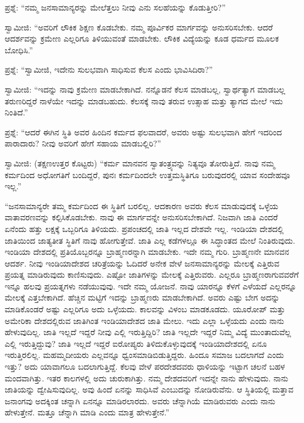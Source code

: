  ಪ್ರಶ್ನೆ: “ನಮ್ಮ ಜನಸಾಮಾನ್ಯರನ್ನು ಮೇಲೆತ್ತಲು ನೀವು ಎನು ಸಲಹೆಯನ್ನು ಕೊಡುತ್ತೀರಿ?” 

 ಸ್ವಾಮೀಜಿ: “ಅವರಿಗೆ ಲೌಕಿಕ ಶಿಕ್ಷಣ ಕೊಡಬೇಕು. ನಮ್ಮ ಪೂರ್ವಿಕರ ಮಾರ್ಗವನ್ನು ಅನುಸರಿಸಬೇಕು. ಆದರೆ ಆದರ್ಶವನ್ನು ಕ್ರಮೇಣ ಎಲ್ಲರಿಗೂ ತಿಳಿಯುವಂತೆ ಮಾಡಬೇಕು. ಲೌಕಿಕ ವಿದ್ಯೆಯನ್ನು ಕೂಡ ಧರ್ಮದ ಮೂಲಕ ಬೋಧಿಸಿ.” 

 ಪ್ರಶ್ನೆ: “ಸ್ವಾಮೀಜಿ, ಇದೇನು ಸುಲಭವಾಗಿ ಸಾಧಿಸುವ ಕೆಲಸ ಎಂದು ಭಾವಿಸಿದಿರಾ?” 

 ಸ್ವಾಮೀಜಿ: “ಇದನ್ನು ನಾವು ಕ್ರಮೇಣ ಮಾಡಬೇಕಾಗಿದೆ. ನನ್ನೊಡನೆ ಕೆಲಸ ಮಾಡಬಲ್ಲ, ಸ್ವಾರ್ಥತ್ಯಾಗ ಮಾಡಬಲ್ಲ ತರುಣರಿದ್ದರೆ ನಾಳೆಯೇ ಇದನ್ನು ಮಾಡಬಹುದು. ಕೆಲಸಕ್ಕೆ ನಾವು ತರುವ ಉತ್ಸಾಹ ಮತ್ತು ತ್ಯಾಗದ ಮೇಲೆ ಇದು ನಿಂತಿದೆ.”‌ 

 ಪ್ರಶ್ನೆ: “ಆದರೆ ಈಗಿನ ಸ್ಥಿತಿ ಅವರ ಹಿಂದಿನ ಕರ್ಮದ ಫಲವಾದರೆ, ಅವರು ಅಷ್ಟು ಸುಲಭವಾಗಿ ಹೇಗೆ ಇದರಿಂದ ಪಾರಾದಾರು? ನೀವು ಅವರಿಗೆ ಹೇಗೆ ಸಹಾಯ ಮಾಡಬಲ್ಲಿರಿ?” 

 ಸ್ವಾಮೀಜಿ: (ತಕ್ಷಣಉತ್ತರ ಕೊಟ್ಟರು) “ಕರ್ಮ ಮಾನವನ ಸ್ವಾತಂತ್ರ್ಯವನ್ನು ನಿತ್ಯವೂ ತೋರುತ್ತಿದೆ. ನಾವು ನಮ್ಮ ಕರ್ಮದಿಂದ ಅಧೋಗತಿಗೆ ಬಂದಿದ್ದರೆ, ಪುನಃ ಕರ್ಮದಿಂದಲೇ ಉತ್ತಮಸ್ಥಿತಿಗೂ ಬರುವುದರಲ್ಲಿ ಯಾವ ಸಂದೇಹವೂ ಇಲ್ಲ.” 

 “ಜನಸಾಮಾನ್ಯರೇ ತಮ್ಮ ಕರ್ಮದಿಂದ ಈ ಸ್ಥಿತಿಗೆ ಬರಲಿಲ್ಲ. ಆದಕಾರಣ ಅವರು ಕೆಲಸ ಮಾಡುವುದಕ್ಕೆ ಒಳ್ಳೆಯ ವಾತಾವರಣವನ್ನು ಕಲ್ಪಿಸಿಕೊಡಬೇಕು. ನಾವು ಈ ಮಾರ್ಗವನ್ನೇ ಅನುಸರಿಸಬೇಕಾಗಿದೆ. ನಿಜವಾಗಿ ಜಾತಿ ಎಂದರೆ ಏನೆಂದು ಹತ್ತು ಲಕ್ಷಕ್ಕೆ ಒಬ್ಬರಿಗೂ ತಿಳಿಯದು. ಪ್ರಪಂಚದಲ್ಲಿ ಜಾತಿ ಇಲ್ಲದ ದೇಶವೇ ಇಲ್ಲ. ಇಂಡಿಯಾ ದೇಶದಲ್ಲಿ ಜಾತಿಯಿಂದ ಜಾತ್ಯತೀತ ಸ್ಥಿತಿಗೆ ನಾವು ಹೋಗುತ್ತೇವೆ. ಜಾತಿ ಎಲ್ಲ ಕಡೆಗಳಲ್ಲೂ ಈ ಸಿದ್ಧಾಂತದ ಮೇಲೆ ನಿಂತಿರುವುದು. ಇಂಡಿಯಾ ದೇಶದಲ್ಲಿ ಪ್ರತಿಯೊಬ್ಬರನ್ನೂ ಬ್ರಾಹ್ಮಣರನ್ನಾಗಿ ಮಾಡಬೇಕು. ಇದೇ ನಮ್ಮ ಗುರಿ. ಬ್ರಾಹ್ಮಣನೇ ಮಾನವನ ಆದರ್ಶ. ನೀವು ಇಂಡಿಯಾದೇಶದ ಚರಿತ್ರೆಯನ್ನು ಓದಿದರೆ ಅನೇಕ ವೇಳೆ ಜನಸಾಮಾನ್ಯರನ್ನು ಮೇಲಕ್ಕೆ ಎತ್ತಿರುವ ಪ್ರಯತ್ನ ಮಾಡಿರುವುದು ಕಾಣಿಸುವುದು. ಎಷ್ಟೋ ಜಾತಿಗಳನ್ನು ಮೇಲಕ್ಕೆ ಎತ್ತಿರುವರು. ಎಲ್ಲರೂ ಬ್ರಾಹ್ಮಣರಾಗುವವರೆಗೆ ಇನ್ನೂ ಹಲವು ಪ್ರಯತ್ನಗಳು ನಡೆಯುವುವು. ಇದೇ ನಮ್ಮ ಯೋಜನೆ. ನಾವು ಯಾರನ್ನೂ ಕೆಳಗೆ ಎಳೆಯದೆ ಎಲ್ಲರನ್ನೂ ಮೇಲಕ್ಕೆ ಎತ್ತಬೇಕಾಗಿದೆ. ಹೆಚ್ಚಿನ ಮಟ್ಟಿಗೆ ಇದನ್ನು ಬ್ರಾಹ್ಮಣರು ಮಾಡಬೇಕಾಗಿದೆ. ಅವರು ಎಷ್ಟು ಬೇಗ ಅದನ್ನು ಮಾಡಿಕೊಂಡರೆ ಅಷ್ಟು ಎಲ್ಲರಿಗೂ ಅದು ಒಳ್ಳೆಯದು. ಕಾಲವನ್ನು ವಿಳಂಬ ಮಾಡಕೂಡದು. ಯೂರೋಪ್ ಮತ್ತು ಅಮೇರಿಕಾ ದೇಶದಲ್ಲಿರುವ ಜಾತಿಗಿಂತ ಇಂಡಿಯಾದೇಶದ ಜಾತಿ ಮೇಲು. ಇದು ಎಲ್ಲಾ ಒಳ್ಳೆಯದು ಎಂದು ನಾನು ಹೇಳುವುದಿಲ್ಲ. ಜಾತಿ ಇಲ್ಲದೆ ಇದ್ದರೆ ನೀವು ಎಲ್ಲಿ ಇರುತ್ತಿದ್ದಿರಿ? ಜಾತಿ ಇಲ್ಲದೇ ಇದ್ದರೆ ನಿಮ್ಮ ವಿದ್ಯೆ ಮುಂತಾದುವೆಲ್ಲ ಎಲ್ಲಿ ಇರುತ್ತಿದ್ದುವು? ಜಾತಿ ಇಲ್ಲದೆ ಇದ್ದರೆ ಐರೋಪ್ಯರು ತಿಳಿದುಕೊಳ್ಳುವುದಕ್ಕೆ ಇಂಡಿಯಾದೇಶದಲ್ಲಿ ಏನೂ ಇರುತ್ತಿರಲಿಲ್ಲ. ಮಹಮ್ಮದೀಯರು ಎಲ್ಲವನ್ನೂ ಧ್ವಂಸಮಾಡಿಬಿಡುತ್ತಿದ್ದರು. ಹಿಂದೂ ಸಮಾಜ ಬದಲಾಗದೆ ಎಂದು ಇತ್ತು? ಅದು ಯಾವಾಗಲೂ ಬದಲಾಗುತ್ತಿದ್ದೆ. ಕೆಲವು ವೇಳೆ ಪರದೇಶದವರು ಧಾಳಿಯನ್ನು ಇಟ್ಟಾಗ ಚಲನೆ ಬಹಳ ಮಂದವಾಗಿತ್ತು. ಇತರ ಕಾಲಗಳಲ್ಲಿ ಅದು ಚುರುಕಾಗಿತ್ತು. ನಮ್ಮ ದೇಶದವರಿಗೆ ಇದನ್ನೇ ನಾನು ಹೇಳುವುದು. ನಾನು ಜಾತಿಯನ್ನು ದ್ವೇಷಿಸುವುದಿಲ್ಲ. ಅವು ಹಿಂದೆ ಏನನ್ನು ಸಾಧಿಸಿವೆ ಎಂಬುದನ್ನು ನೋಡಿರುವೆನು. ಆ ಸ್ಥಿತಿಯಲ್ಲಿ ಮತ್ತಾವ ಜನಾಂಗವು ಅದಕ್ಕಿಂತ ಚನ್ನಾಗಿ ಏನನ್ನೂ ಮಾಡಿರಲಾರದು. ಅವರು ಚೆನ್ನಾಗಿಯೆ ಮಾಡಿರುವರು ಎಂದು ನಾನು ಹೇಳುತ್ತೇನೆ. ಮತ್ತೂ ಚೆನ್ನಾಗಿ ಮಾಡಿ ಎಂದು ಮಾತ್ರ ಹೇಳುತ್ತೇನೆ.” 


